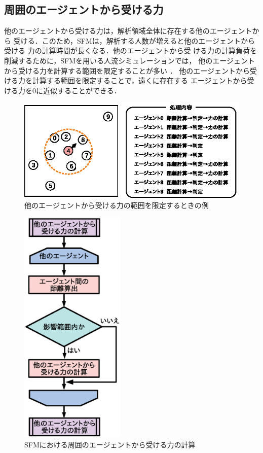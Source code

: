 \subsection{周囲のエージェントから受ける力}
他のエージェントから受ける力は，解析領域全体に存在する他のエージェントから
受ける．このため，SFMは，解析する人数が増えると他のエージェントから受ける
力の計算時間が長くなる．他のエージェントから受
ける力の計算負荷を削減するために，SFMを用いる人流シミュレーションでは，
他のエージェントから受ける力を計算する範囲を限定することが多い
\cite{seru_sfm1}\cite{seru_sfm2}．
他のエージェントから受ける力を計算する範囲を限定することで，遠くに存在する
エージェントから受ける力を0に近似することができる．
%
\begin{figure}[t]
 \begin{center}
  \includegraphics[width=11.5cm,clip]{figure/eikyo_hankei_ex1.eps}
  \caption{他のエージェントから受ける力の範囲を限定するときの例}
  \label{fig:sougo_hani}
 \end{center}
\end{figure}
%
\begin{figure}[t]
 \begin{center}
  \includegraphics[width=5cm,clip]{figure/agent_flow.eps}
  \caption{SFMにおける周囲のエージェントから受ける力の計算}
  \label{fig:sougo_hani_flow}
 \end{center}
\end{figure}

